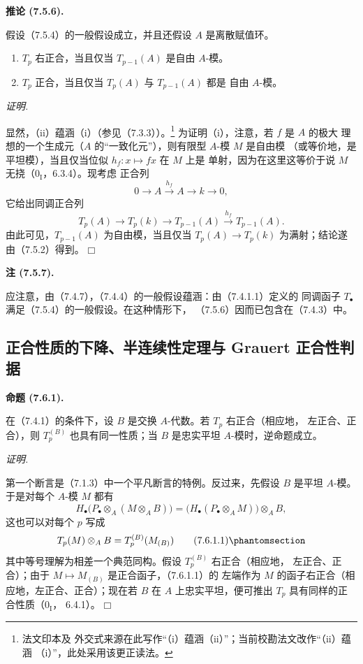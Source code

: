 \documentclass[UTF8,fontset=none,11pt,oneside,openany]{ctexbook}
\providecommand{\square}{\mdlgwhtsquare}
\newcommand{\SourceCorrectionNote}[1]{\footnote{#1}}
\newenvironment{proposition}[1][]{%
  \par\medskip\noindent\textbf{命题 (#1).}\ %
}{\par}
\newenvironment{corollary}[1][]{%
  \par\medskip\noindent\textbf{推论 (#1).}\ %
}{\par}
\newenvironment{remark}[1][]{%
  \par\medskip\noindent\textbf{注 (#1).}\ %
}{\par}
\newenvironment{proof}{%
  \par\smallskip\noindent\textit{证明.}\ %
}{\hfill$\square$\par}
\newcommand{\oldpage}[2][]{%
  \hypertarget{ega-source-page-#1-#2}{}%
  \marginnote{\scriptsize\textbf{#1}~|~#2}\ignorespaces}
\let\EGAOriginalLabel\label
\renewcommand{\label}[1]{\phantomsection\EGAOriginalLabel{#1}}
\begin{document}
\begin{corollary}[7.5.6]
假设（7.5.4）的一般假设成立，并且还假设 $A$ 是离散赋值环。
\begin{enumerate}
  \item[(i)] $T_p$ 右正合，当且仅当 $T_{p-1}(A)$ 是自由 $A$-模。
  \item[(ii)] $T_p$ 正合，当且仅当 $T_p(A)$ 与 $T_{p-1}(A)$ 都是
    自由 $A$-模。
\end{enumerate}
\end{corollary}

\begin{proof}
\oldpage[III]{192}
显然，（ii）蕴涵（i）（参见（7.3.3））。\SourceCorrectionNote{法文印本及
外交式来源在此写作“（i）蕴涵（ii）”；当前校勘法文改作“（ii）蕴涵
（i）”，此处采用该更正读法。} 为证明（i），注意，若 $f$ 是 $A$ 的极大
理想的一个生成元（$A$ 的“一致化元”），则有限型 $A$-模 $M$ 是自由模
（或等价地，是平坦模），当且仅当位似 $h_f:x\mapsto fx$ 在 $M$ 上是
单射，因为在这里这等价于说 $M$ 无挠（$0_{\mathrm I}$，6.3.4）。现考虑
正合列
\[
  0\longrightarrow A\xrightarrow{h_f}A\longrightarrow k\longrightarrow0,
\]
它给出同调正合列
\[
  T_p(A)
  \longrightarrow T_p(k)
  \longrightarrow T_{p-1}(A)
  \xrightarrow{h_f}T_{p-1}(A).
\]
由此可见，$T_{p-1}(A)$ 为自由模，当且仅当
$T_p(A)\to T_p(k)$ 为满射；结论遂由（7.5.2）得到。
\end{proof}

\begin{remark}[7.5.7]
应注意，由（7.4.7），（7.4.4）的一般假设蕴涵：由（7.4.1.1）定义的
同调函子 $T_\bullet$ 满足（7.5.4）的一般假设。在这种情形下，
（7.5.6）因而已包含在（7.4.3）中。
\end{remark}

\subsection{正合性质的下降、半连续性定理与 Grauert 正合性判据}
\label{subsection:III.7.6.fr}

\begin{proposition}[7.6.1]
在（7.4.1）的条件下，设 $B$ 是交换 $A$-代数。若 $T_p$ 右正合（相应地，
左正合、正合），则 $T_p^{(B)}$ 也具有同一性质；当 $B$ 是忠实平坦
$A$-模时，逆命题成立。
\end{proposition}

\begin{proof}
第一个断言是（7.1.3）中一个平凡断言的特例。反过来，先假设 $B$ 是平坦
$A$-模。于是对每个 $A$-模 $M$ 都有
\[
  H_\bullet\bigl(P_\bullet\otimes_A(M\otimes_A B)\bigr)
  =
  \bigl(H_\bullet(P_\bullet\otimes_A M)\bigr)\otimes_A B,
\]
这也可以对每个 $p$ 写成
\[
  T_p(M)\otimes_A B
  =
  T_p^{(B)}(M_{(B)})
  \tag{7.6.1.1}\label{III.7.6.1.1.fr}
\]
其中等号理解为相差一个典范同构。假设 $T_p^{(B)}$ 右正合（相应地，
左正合、正合）；由于 $M\mapsto M_{(B)}$ 是正合函子，（7.6.1.1）的
左端作为 $M$ 的函子右正合（相应地，左正合、正合）；现在若 $B$ 在
$A$ 上忠实平坦，便可推出 $T_p$ 具有同样的正合性质（$0_{\mathrm I}$，
6.4.1）。
\end{proof}
\end{document}
